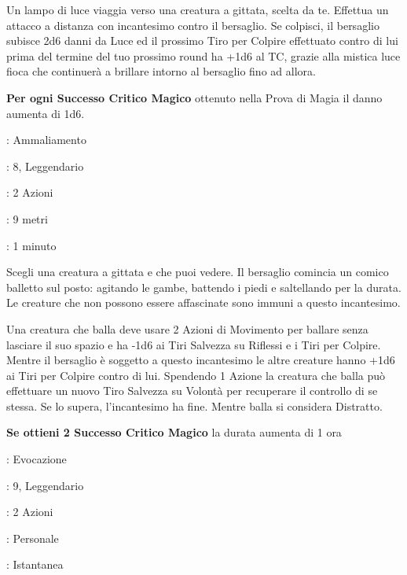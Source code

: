 \begin{multicols}{2}
Un lampo di luce viaggia verso una creatura a gittata, scelta da te. Effettua un attacco a distanza con incantesimo contro il bersaglio. Se colpisci, il bersaglio subisce 2d6 danni da Luce ed il prossimo Tiro per Colpire effettuato contro di lui prima del termine del tuo prossimo round ha +1d6 al TC, grazie alla mistica luce fioca che continuerà a brillare intorno al bersaglio fino ad allora.

\textbf{Per ogni Successo Critico Magico} ottenuto nella Prova di Magia il danno aumenta di 1d6.

\noindent\colorbox{OBSSgold!10}{
\begin{minipage}{0.95\linewidth}
\begin{description}[noitemsep, topsep=0pt, parsep=0pt, partopsep=0pt, leftmargin=0cm, labelwidth=1.3cm]
	\item[\textbf{Lista}]: Ammaliamento
	\item[\textbf{Livello}]: 8, Leggendario
	\item[\textbf{Lancio}]: 2 Azioni
	\item[\textbf{Gittata}]: 9 metri
	\item[\textbf{Durata}]: 1 minuto
\end{description}
\end{minipage}}\smallskip

Scegli una creatura a gittata e che puoi vedere. Il bersaglio comincia un comico balletto sul posto: agitando le gambe, battendo i piedi e saltellando per la durata. Le creature che non possono essere affascinate sono immuni a questo incantesimo.

Una creatura che balla deve usare 2 Azioni di Movimento per ballare senza lasciare il suo spazio e ha -1d6 ai Tiri Salvezza su Riflessi e i Tiri per Colpire. Mentre il bersaglio è soggetto a questo incantesimo le altre creature hanno +1d6 ai Tiri per Colpire contro di lui. Spendendo 1 Azione la creatura che balla può effettuare un nuovo Tiro Salvezza su Volontà per recuperare il controllo di se stessa. Se lo supera, l'incantesimo ha fine. Mentre balla si considera Distratto.

\textbf{Se ottieni 2 Successo Critico Magico} la durata aumenta di 1 ora

\noindent\colorbox{OBSSgold!10}{
\begin{minipage}{0.95\linewidth}
\begin{description}[noitemsep, topsep=0pt, parsep=0pt, partopsep=0pt, leftmargin=0cm, labelwidth=1.3cm]
	\item[\textbf{Lista}]: Evocazione
	\item[\textbf{Livello}]: 9, Leggendario
	\item[\textbf{Lancio}]: 2 Azioni
	\item[\textbf{Gittata}]: Personale
	\item[\textbf{Durata}]: Istantanea
\end{description}
\end{minipage}}\smallskip


\end{multicols}
